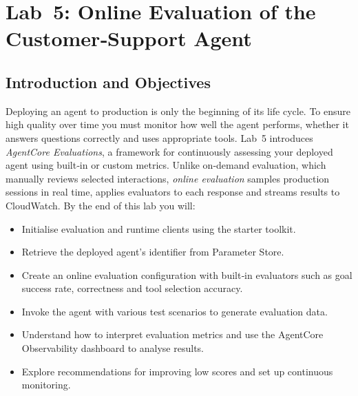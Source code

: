 

\chapter{Lab 5: Online Evaluation of the Customer‑Support Agent}
\label{chap:Lab 5: Online Evaluation of the Customer‑Support Agent}



\section{Introduction and Objectives}

Deploying an agent to production is only the beginning of its life
cycle.  To ensure high quality over time you must monitor how well the
agent performs, whether it answers questions correctly and uses
appropriate tools.  Lab 5 introduces \emph{AgentCore Evaluations}, a
framework for continuously assessing your deployed agent using built‑in
or custom metrics.  Unlike on‑demand evaluation, which manually
reviews selected interactions, \emph{online evaluation} samples
production sessions in real time, applies evaluators to each response
and streams results to CloudWatch.  By the end of this lab you will:

\begin{itemize}
  \item Initialise evaluation and runtime clients using the starter
        toolkit.
  \item Retrieve the deployed agent’s identifier from Parameter Store.
  \item Create an online evaluation configuration with built‑in
        evaluators such as goal success rate, correctness and tool
        selection accuracy.
  \item Invoke the agent with various test scenarios to generate
        evaluation data.
  \item Understand how to interpret evaluation metrics and use the
        AgentCore Observability dashboard to analyse results.
  \item Explore recommendations for improving low scores and set up
        continuous monitoring.
\end{itemize}

